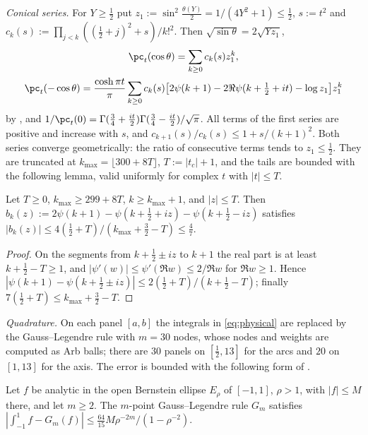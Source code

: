 \emph{Conical series.} For $Y\ge\frac12$ put $z_1:=\sin^2\frac{\theta(Y)}2=1/(4Y^2+1)\le\frac12$, $s:=t^2$ and
$c_k(s):=\prod_{j<k}((\frac12+j)^2+s)/k!^2$. Then $\sqrt{\sin\theta}=2\sqrt{Yz_1}$,
\begin{gather*}
\pc_t(\cos\theta)=\sum_{k\ge0}c_k(s)z_1^k,\\
\pc_t(-\cos\theta)=\frac{\cosh\pi t}\pi\sum_{k\ge0}c_k(s)\big[2\psi(k+1)-2\Re\psi(k+\tfrac12+it)-\log z_1\big]z_1^k
\end{gather*}
by \cite[14.3.1, 15.8.10]{DLMF}, and $1/\pc_t(0)=\Gamma(\frac34+\frac{it}2)\Gamma(\frac34-\frac{it}2)/\sqrt\pi$. All terms of the first series are
positive and increase with $s$, and $c_{k+1}(s)/c_k(s)\le1+s/(k+1)^2$. Both series converge geometrically: the ratio of consecutive terms tends to $z_1\le\frac12$. They are
truncated at $k_{\max}=\lfloor300+8T\rfloor$, $T:=|t_c|+1$, and the tails are bounded with the following lemma, valid uniformly for complex
$t$ with $|t|\le T$.

\begin{lemma}\label{lem:bracket}
Let $T\ge0$, $k_{\max}\ge299+8T$, $k\ge k_{\max}+1$, and $|z|\le T$. Then
$b_k(z):=2\psi(k+1)-\psi(k+\frac12+iz)-\psi(k+\frac12-iz)$ satisfies $|b_k(z)|\le4(\frac12+T)/(k_{\max}+\frac32-T)\le\frac47$.
\end{lemma}

\begin{proof}
On the segments from $k+\frac12\pm iz$ to $k+1$ the real part is at least $k+\frac12-T\ge1$, and $|\psi'(w)|\le\psi'(\Re w)\le2/\Re w$ for
$\Re w\ge1$. Hence $|\psi(k+1)-\psi(k+\frac12\pm iz)|\le2(\frac12+T)/(k+\frac12-T)$; finally $7(\frac12+T)\le k_{\max}+\frac32-T$.
\end{proof}

\emph{Quadrature.} On each panel $[a,b]$ the integrals in \eqref{eq:physical} are replaced by the Gauss--Legendre rule with $m=30$ nodes, whose
nodes and weights are computed as Arb balls; there are $30$ panels on $[\frac12,13]$ for the arcs and $20$ on $[1,13]$ for the axis. The error is
bounded with the following form of \cite[Theorem~19.3]{Tre13}.

\begin{lemma}\label{lem:gauss}
Let $f$ be analytic in the open Bernstein ellipse $E_\rho$ of $[-1,1]$, $\rho>1$, with $|f|\le M$ there, and let $m\ge2$. The $m$-point
Gauss--Legendre rule $G_m$ satisfies $|\int_{-1}^1f-G_m(f)|\le\frac{64}{15}M\rho^{-2m}/(1-\rho^{-2})$.
\end{lemma}

